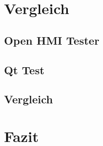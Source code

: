 \chapter{Vergleich}

	\section{Open HMI Tester}
	\section{Qt Test}
	\section{Vergleich}

\chapter{Fazit}
%			

	